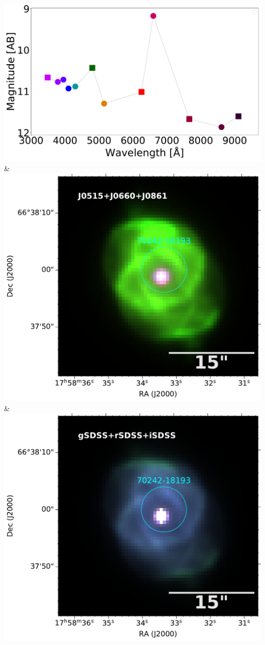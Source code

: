 \includegraphics[width=0.3\linewidth, clip]{figs-pca/photospectrum_70242-18193-Missing-pne-allinf-v2_MAG_APER_6_0.pdf} & \includegraphics[width=0.3\linewidth, clip]{Field_70242/1000001-JPLUS-03035-v202006_J0861_70242-18193-RGB.pdf} & \includegraphics[width=0.3\linewidth, clip]{Field_70242/1000001-JPLUS-03035-v202006_iSDSS_70242-18193-RGB.pdf} \\
